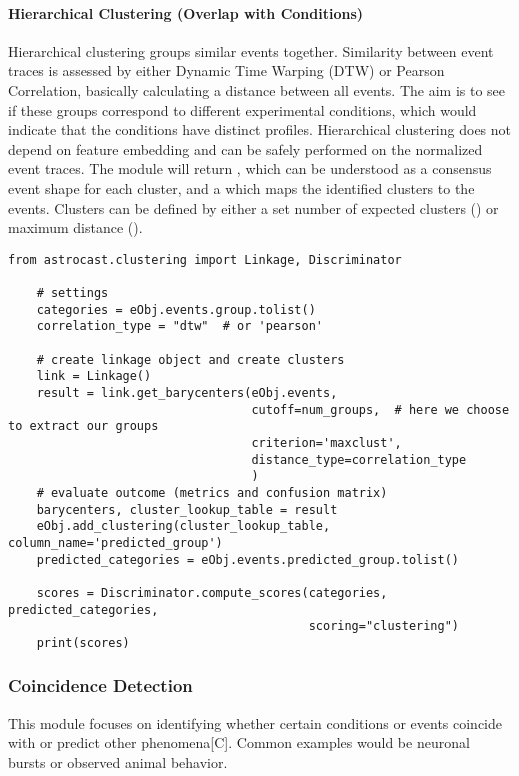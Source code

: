 \paragraph{Hierarchical Clustering (Overlap with Conditions)}
Hierarchical clustering groups similar events together. Similarity between event traces is assessed by either Dynamic Time Warping (DTW) or Pearson Correlation, basically calculating a distance between all events. The aim is to see if these groups correspond to different experimental conditions, which would indicate that the conditions have distinct profiles. Hierarchical clustering does not depend on feature embedding and can be safely performed on the normalized event traces. The  module will return , which can be understood as a consensus event shape for each cluster, and a  which maps the identified clusters to the events. Clusters can be defined by either a set number of expected clusters () or maximum distance ().

\begin{lstlisting}[style=pyStyle]
    from astrocast.clustering import Linkage, Discriminator

    # settings
    categories = eObj.events.group.tolist()
    correlation_type = "dtw"  # or 'pearson'

    # create linkage object and create clusters
    link = Linkage()
    result = link.get_barycenters(eObj.events,
                                  cutoff=num_groups,  # here we choose to extract our groups
                                  criterion='maxclust',
                                  distance_type=correlation_type
                                  )
    # evaluate outcome (metrics and confusion matrix)
    barycenters, cluster_lookup_table = result
    eObj.add_clustering(cluster_lookup_table, column_name='predicted_group')
    predicted_categories = eObj.events.predicted_group.tolist()

    scores = Discriminator.compute_scores(categories, predicted_categories,
                                          scoring="clustering")
    print(scores)
\end{lstlisting}

\subsubsection{Coincidence Detection}
This module focuses on identifying whether certain conditions or events coincide with or predict other phenomena[C]. Common examples would be neuronal bursts or observed animal behavior.

